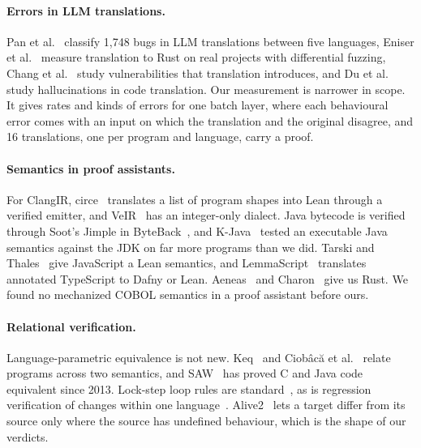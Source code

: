 \paragraph{Errors in LLM translations.} Pan et al.~\cite{pan2024lost} classify 1,748 bugs in LLM translations between
five languages, Eniser et al.~\cite{eniser2024} measure translation to Rust on real projects with differential fuzzing,
Chang et al.~\cite{chang2025} study vulnerabilities that translation introduces, and Du et al.~\cite{du2026} study
hallucinations in code translation. Our measurement is narrower in scope. It gives rates and kinds of errors for one batch layer, where
each behavioural error comes with an input on which the translation and the original disagree, and 16 translations,
one per program and language, carry a proof.

\paragraph{Semantics in proof assistants.} For ClangIR, circe~\cite{circe} translates a list of program shapes into
Lean through a verified emitter, and VeIR~\cite{veircir} has an integer-only  dialect. Java bytecode is
verified through Soot's Jimple in ByteBack~\cite{bytebackfm}, and K-Java~\cite{kjava} tested an executable Java
semantics against the JDK on far more programs than we did. Tarski and Thales~\cite{thales} give JavaScript a Lean
semantics, and LemmaScript~\cite{lemmascript} translates annotated TypeScript to Dafny or Lean. Aeneas~\cite{aeneas}
and Charon~\cite{charon} give us Rust. We found no mechanized COBOL semantics in a proof assistant before ours.

\paragraph{Relational verification.} Language-parametric equivalence is not new. Keq~\cite{keq} and Ciob\^ac\u{a} et
al.~\cite{ciobaca} relate programs across two semantics, and SAW~\cite{saw} has proved C and Java code equivalent
since 2013. Lock-step loop rules are standard~\cite{refinemonadic,l4v,compcert,sewell}, as is regression
verification of changes within one language~\cite{godlinstrichman,reve,symdiff}. Alive2~\cite{alive2} lets a target
differ from its source only where the source has undefined behaviour, which is the shape of our 
verdicts.

